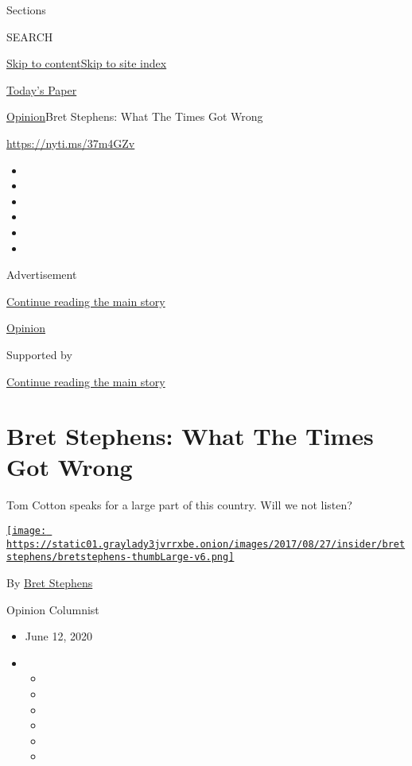 Sections

SEARCH

\protect\hyperlink{site-content}{Skip to
content}\protect\hyperlink{site-index}{Skip to site index}

\href{https://myaccount.nytimes3xbfgragh.onion/auth/login?response_type=cookie\&client_id=vi}{}

\href{https://www.nytimes3xbfgragh.onion/section/todayspaper}{Today's
Paper}

\href{/section/opinion}{Opinion}\textbar{}Bret Stephens: What The Times
Got Wrong

\url{https://nyti.ms/37m4GZv}

\begin{itemize}
\item
\item
\item
\item
\item
\item
\end{itemize}

Advertisement

\protect\hyperlink{after-top}{Continue reading the main story}

\href{/section/opinion}{Opinion}

Supported by

\protect\hyperlink{after-sponsor}{Continue reading the main story}

\hypertarget{bret-stephens-what-the-times-got-wrong}{%
\section{Bret Stephens: What The Times Got
Wrong}\label{bret-stephens-what-the-times-got-wrong}}

Tom Cotton speaks for a large part of this country. Will we not listen?

\href{https://www.nytimes3xbfgragh.onion/by/bret-stephens}{\texttt{[image: https://static01.graylady3jvrrxbe.onion/images/2017/08/27/insider/bretstephens/bretstephens-thumbLarge-v6.png]}}

By \href{https://www.nytimes3xbfgragh.onion/by/bret-stephens}{Bret
Stephens}

Opinion Columnist

\begin{itemize}
\item
  June 12, 2020
\item
  \begin{itemize}
  \item
  \item
  \item
  \item
  \item
  \item
  \end{itemize}
\end{itemize}

